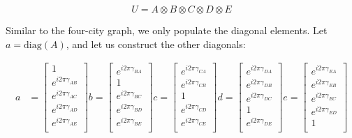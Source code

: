\documentclass[msc,oneside]{ubcthesis}
\begin{document}
	\begin{equation}\label{5-city-matrix-tensor}
		U = A \otimes B \otimes C \otimes D \otimes E
	\end{equation}
	
	 Similar to the four-city graph, we only populate the diagonal elements. Let  $a=\mathrm{diag}(A)$, and let us construct the other diagonals:
	
	\begin{align*}	
		a & = \begin{bmatrix}
			1 \\
			e^{i2\pi\gamma_{AB}} \\
			e^{i2\pi\gamma_{AC}} \\
			e^{i2\pi\gamma_{AD}} \\
			e^{i2\pi\gamma_{AE}} \\
		\end{bmatrix} 
		b  = \begin{bmatrix}
			e^{i2\pi\gamma_{BA}} \\
			1 \\
			e^{i2\pi\gamma_{BC}} \\
			e^{i2\pi\gamma_{BD}} \\
			e^{i2\pi\gamma_{BE}} \\
		\end{bmatrix}
		c  = \begin{bmatrix}
			e^{i2\pi\gamma_{CA}} \\
			e^{i2\pi\gamma_{CB}} \\
			1 \\
			e^{i2\pi\gamma_{CD}} \\
			e^{i2\pi\gamma_{CE}} \\
		\end{bmatrix} 
		d = \begin{bmatrix}
			e^{i2\pi\gamma_{DA}} \\
			e^{i2\pi\gamma_{DB}} \\
			e^{i2\pi\gamma_{DC}} \\
			1 \\
			e^{i2\pi\gamma_{DE}} \\
		\end{bmatrix}  
		e = \begin{bmatrix}
			e^{i2\pi\gamma_{EA}} \\
			e^{i2\pi\gamma_{EB}} \\
			e^{i2\pi\gamma_{EC}} \\
			e^{i2\pi\gamma_{ED}} \\
			1 \\
		\end{bmatrix}		 			
	\end{align*}
	
\end{document}
